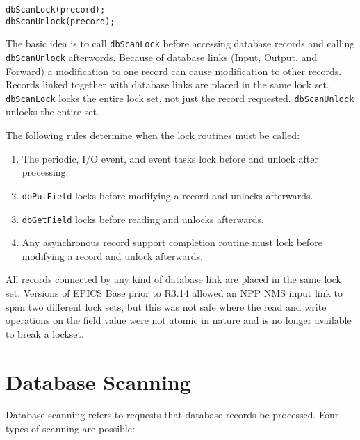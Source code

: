 \begin{verbatim}
dbScanLock(precord);
dbScanUnlock(precord);
\end{verbatim}

The basic idea is to call \verb|dbScanLock| before accessing database records and calling \verb|dbScanUnlock| afterwords.
Because of database links (Input, Output, and Forward) a modification to one record can cause modification to other records.
Records linked together with database links are placed in the same lock set.
\verb|dbScanLock| locks the entire lock set, not just the record requested.
\verb|dbScanUnlock| unlocks the entire set.

The following rules determine when the lock routines must be called:

\begin{enumerate}
\item The periodic, I/O event, and event tasks lock before and unlock after processing:

\item \verb|dbPutField| locks before modifying a record and unlocks afterwards.

\item \verb|dbGetField| locks before reading and unlocks afterwards.

\item Any asynchronous record support completion routine must lock before modifying a record and unlock afterwards.

\end{enumerate}

All records connected by any kind of database link are placed in the same lock set.
Versions of EPICS Base prior to R3.14 allowed an NPP NMS input link to span two different lock sets, but this was not safe where the read and write operations on the field value were not atomic in nature and is no longer available to break a lockset.

\section{Database Scanning}

Database scanning refers to requests that database records be processed.
Four types of scanning are possible:

